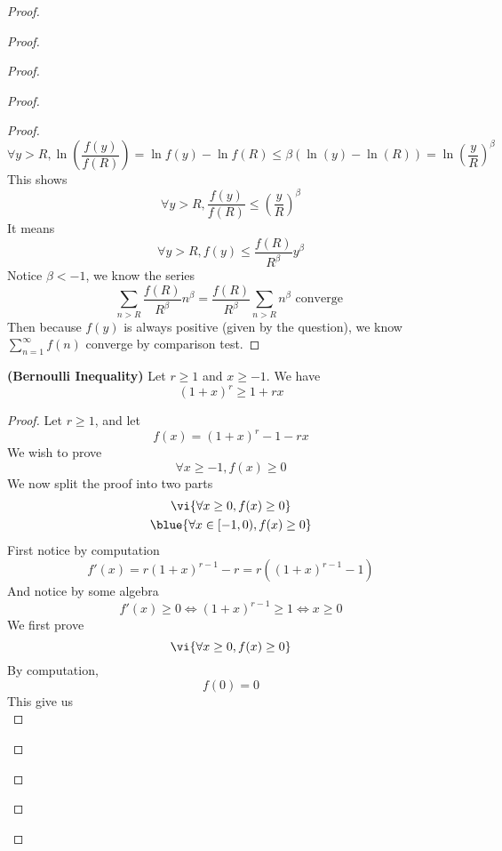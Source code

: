 \documentclass{report}
\begin{document}
\begin{proof}
\begin{proof}
\begin{proof}
\begin{proof}
\begin{proof}
\begin{equation}
\forall y>R,\ln ( \frac{f(y)}{f(R)})=\ln f(y)-\ln f(R)\leq \beta (\ln(y)-\ln(R))= \ln(\frac{y}{R})^\beta 
\end{equation}
This shows
\begin{equation}
\forall y>R, \frac{f(y)}{f(R)}\leq (\frac{y}{R})^{\beta }
\end{equation}
It means
\begin{equation}
\forall y>R, f(y)\leq \frac{f(R)}{R^{\beta }}y^{\beta }
\end{equation}
Notice $\beta <-1$, we know the series 
\begin{equation}
\sum_{n>R} \frac{f(R)}{R^{\beta }}n^{\beta }=\frac{f(R)}{R^{\beta }}\sum_{n>R}n^{\beta }\text{ converge }
\end{equation}
Then because $f(y)$ is always positive (given by the question), we know $\sum_{n=1}^\infty f(n)$ converge by comparison test.
\end{proof}
\begin{lemma}
\label{11.3.4}
\textbf{(Bernoulli Inequality)} Let  $r\geq 1$ and $x\geq -1$. We have
\begin{equation}
  (1+x)^r\geq 1+rx
\end{equation}
\end{lemma}
\begin{proof}
Let $r\geq 1$, and let
\begin{equation}
f(x)=(1+x)^r-1-rx
\end{equation}
We wish to prove 
\begin{equation}
\forall x\geq -1, f(x)\geq 0
\end{equation}
We now split the proof into two parts
\begin{gather}
  \vi{\forall x\geq 0, f(x)\geq 0}\\
  \blue{\forall x\in [-1,0), f(x)\geq 0}
\end{gather}
First notice by computation
\begin{equation}
f'(x)=r(1+x)^{r-1}-r=r((1+x)^{r-1}-1)
\end{equation}
And notice by some algebra
\begin{equation}
f'(x)\geq 0\iff  (1+x)^{r-1}\geq 1\iff  x\geq 0
\end{equation}
We first prove 
\begin{equation}
\vi{\forall x\geq 0, f(x)\geq 0}
\end{equation}
By computation,
\begin{equation}
f(0)=0
\end{equation}
This give us 
\begin{equation}

\end{equation}
\end{proof}
\end{proof}
\end{proof}
\end{proof}
\end{proof}
\end{document}
